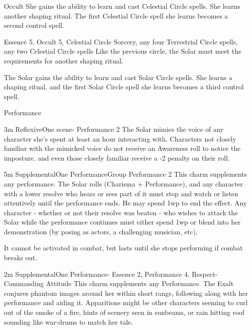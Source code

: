\begin{Ability}{Occult}
  She gains the ability to learn and cast Celestial Circle spells. She learns another shaping ritual. The first Celestial Circle spell she learns becomes a second control spell.

  {Essence 5, Occult 5, Celestial Circle Sorcery, any four Terrestrial Circle spells, any two Celestial Circle spells}
  Like the previous circle, the Solar must meet the requirements for another shaping ritual.

  The Solar gains the ability to learn and cast Solar Circle spells. She learns a shaping ritual, and the first Solar Circle spell she learns becomes a third control spell.

\end{Ability}

\begin{Ability}{Performance}

  {3m}
  {Reflexive}{One scene}{-}
  {Performance 2}
  The Solar mimics the voice of any character she's spent at least an hour interacting with. Characters not closely familiar with the mimicked voice do not receive an Awareness roll to notice the imposture, and even those closely familiar receive a -2 penalty on their roll.

  {5m}
  {Supplemental}{One Performance}{Group}
  {Performance 2}
  This charm supplements any performance. The Solar rolls (Charisma + Performance), and any character with a lower resolve who hears or sees part of it must stop and watch or listen attentively until the performance ends. He may spend 1wp to end the effect. Any character - whether or not their resolve was beaten - who wishes to attack the Solar while the performance continues must either spend 1wp or blend into her demonstration (by posing as actors, a challenging musician, etc).

  It cannot be activated in combat, but lasts until she stops performing if combat breaks out.

  {2m}
  {Supplemental}{One Performance}{-}
  {Essence 2, Performance 4, Respect-Commanding Attitude}
  This charm supplements any Performance. The Exalt conjures phantom images around her within short range, following along with her performance and aiding it. Apparitions might be other characters seeming to curl out of the smoke of a fire, hints of scenery seen in sunbeams, or rain hitting roof sounding like war-drums to match her tale.


\end{Ability}
